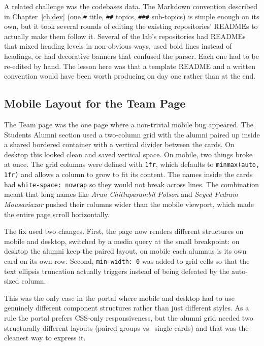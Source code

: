 A related challenge was the codebases data. The Markdown convention described in Chapter~\ref{ch:dev} (one \texttt{\#} title, \texttt{\#\#} topics, \texttt{\#\#\#} sub-topics) is simple enough on its own, but it took several rounds of editing the existing repositories' READMEs to actually make them follow it. Several of the lab's repositories had READMEs that mixed heading levels in non-obvious ways, used bold lines instead of headings, or had decorative banners that confused the parser. Each one had to be re-edited by hand. The lesson here was that a template README and a written convention would have been worth producing on day one rather than at the end.

\subsection{Mobile Layout for the Team Page}\label{subsec:challenges-team-mobile}

The Team page was the one page where a non-trivial mobile bug appeared. The Students Alumni section used a two-column grid with the alumni paired up inside a shared bordered container with a vertical divider between the cards. On desktop this looked clean and saved vertical space. On mobile, two things broke at once. The grid columns were defined with \texttt{1fr}, which defaults to \texttt{minmax(auto, 1fr)} and allows a column to grow to fit its content. The names inside the cards had \texttt{white-space: nowrap} so they would not break across lines. The combination meant that long names like \textit{Arun Chittuparambil Polson} and \textit{Seyed Pedram Mousaviazar} pushed their columns wider than the mobile viewport, which made the entire page scroll horizontally.

The fix used two changes. First, the page now renders different structures on mobile and desktop, switched by a media query at the small breakpoint: on desktop the alumni keep the paired layout, on mobile each alumnus is its own card on its own row. Second, \texttt{min-width: 0} was added to grid cells so that the text ellipsis truncation actually triggers instead of being defeated by the auto-sized column.

This was the only case in the portal where mobile and desktop had to use genuinely different component structures rather than just different styles. As a rule the portal prefers CSS-only responsiveness, but the alumni grid needed two structurally different layouts (paired groups vs.\ single cards) and that was the cleanest way to express it.


